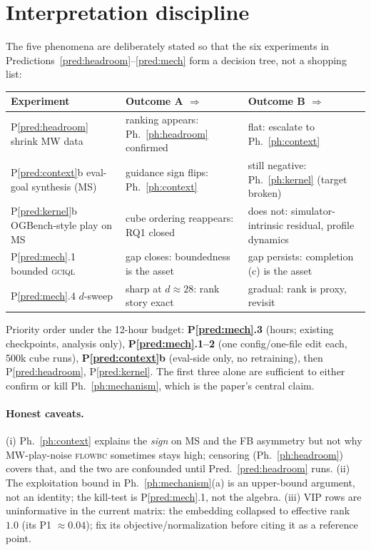 \documentclass[10pt]{article}
\begin{document}
\section{Interpretation discipline}

The five phenomena are deliberately stated so that the six experiments in
Predictions~\ref{pred:headroom}--\ref{pred:mech} form a decision tree, not a shopping list:
\begin{center}
\small
\begin{tabular}{lll}
\toprule
Experiment & Outcome A $\Rightarrow$ & Outcome B $\Rightarrow$\\
\midrule
P\ref{pred:headroom} shrink MW data & ranking appears: Ph.~\ref{ph:headroom} confirmed &
flat: escalate to Ph.~\ref{ph:context}\\
P\ref{pred:context}b eval-goal synthesis (MS) & guidance sign flips: Ph.~\ref{ph:context} &
still negative: Ph.~\ref{ph:kernel} (target broken)\\
P\ref{pred:kernel}b OGBench-style play on MS & cube ordering reappears: RQ1 closed &
does not: simulator-intrinsic residual, profile dynamics\\
P\ref{pred:mech}.1 bounded \textsc{gciql} & gap closes: boundedness is the asset &
gap persists: completion (c) is the asset\\
P\ref{pred:mech}.4 $d$-sweep & sharp at $d\!\approx\!28$: rank story exact &
gradual: rank is proxy, revisit\\
\bottomrule
\end{tabular}
\end{center}

Priority order under the 12-hour budget: \textbf{P\ref{pred:mech}.3} (hours; existing
checkpoints, analysis only), \textbf{P\ref{pred:mech}.1--2} (one config/one-file edit each,
500k cube runs), \textbf{P\ref{pred:context}b} (eval-side only, no retraining),
then P\ref{pred:headroom}, P\ref{pred:kernel}. The first three alone are sufficient to
either confirm or kill Ph.~\ref{ph:mechanism}, which is the paper's central claim.

\paragraph{Honest caveats.} (i) Ph.~\ref{ph:context} explains the \emph{sign} on MS and the
FB asymmetry but not why MW-play-noise \textsc{flowbc} sometimes stays high; censoring
(Ph.~\ref{ph:headroom}) covers that, and the two are confounded until
Pred.~\ref{pred:headroom} runs. (ii) The exploitation bound in Ph.~\ref{ph:mechanism}(a) is
an upper-bound argument, not an identity; the kill-test is P\ref{pred:mech}.1, not the
algebra. (iii) VIP rows are uninformative in the current matrix: the embedding collapsed to
effective rank $1.0$ (its P1 $\approx0.04$); fix its objective/normalization before citing
it as a reference point.
\end{document}
